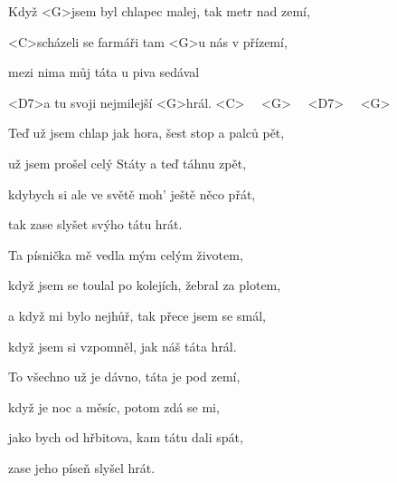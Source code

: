 

\zs
Když <G>jsem byl chlapec malej, tak metr nad zemí,

<C>scházeli se farmáři tam <G>u nás v přízemí,

mezi nima můj táta u piva sedával

<D7>a tu svoji nejmilejší <G>hrál.
<C>~~
<G>~~
<D7>~~
<G>~~
\ks

\zs
Teď už jsem chlap jak hora, šest stop a palců pět,

už jsem prošel celý Státy a teď táhnu zpět,

kdybych si ale ve světě moh' ještě něco přát,

tak zase slyšet svýho tátu hrát.
\ks

\zs
Ta písnička mě vedla mým celým životem,

když jsem se toulal po kolejích, žebral za plotem,

a když mi bylo nejhůř, tak přece jsem se smál,

když jsem si vzpomněl, jak náš táta hrál.
\ks

\zs
To všechno už je dávno, táta je pod zemí,

když je noc a měsíc, potom zdá se mi,

jako bych od hřbitova, kam tátu dali spát,

zase jeho píseň slyšel hrát.
\ks

\kp







